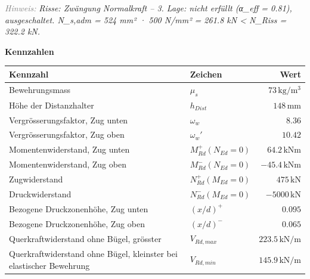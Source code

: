 \documentclass[11pt,a4paper]{article}
\newcommand{\hinweis}[2]{\par\noindent\textcolor{gray}{\textit{#1:}} \textit{#2}\par}
\begin{document}
\hinweis{Hinweis}{Risse: Zwängung Normalkraft – 3. Lage: nicht erfüllt (α\_eff = 0.81), ausgeschaltet. N\_s,adm = 524 mm² · 500 N/mm² = 261.8 kN < N\_Riss = 322.2 kN.}
\noindent\textbf{Kennzahlen}
\begin{longtable}{llr}
\hline
Kennzahl & Zeichen & Wert \\
\hline
\endhead
Bewehrungsmass & $\mu_s$ & $73\,\mathrm{kg}/\mathrm{m}^{3}$ \\
Höhe der Distanzhalter & $h_{Dist}$ & $148\,\mathrm{mm}$ \\
Vergrösserungsfaktor, Zug unten & $\omega_w$ & $8.36$ \\
Vergrösserungsfaktor, Zug oben & $\omega_w'$ & $10.42$ \\
Momentenwiderstand, Zug unten & $M_{Rd}^{+}(N_{Ed} = 0)$ & $64.2\,\mathrm{kNm}$ \\
Momentenwiderstand, Zug oben & $M_{Rd}^{-}(N_{Ed} = 0)$ & $-45.4\,\mathrm{kNm}$ \\
Zugwiderstand & $N_{Rd}^{+}(M_{Ed} = 0)$ & $475\,\mathrm{kN}$ \\
Druckwiderstand & $N_{Rd}^{-}(M_{Ed} = 0)$ & $-5000\,\mathrm{kN}$ \\
Bezogene Druckzonenhöhe, Zug unten & $\left(x/d\right)^{+}$ & $0.095$ \\
Bezogene Druckzonenhöhe, Zug oben & $\left(x/d\right)^{-}$ & $0.065$ \\
Querkraftwiderstand ohne Bügel, grösster & $V_{Rd,max}$ & $223.5\,\mathrm{kN}/\mathrm{m}$ \\
Querkraftwiderstand ohne Bügel, kleinster bei elastischer Bewehrung & $V_{Rd,min}$ & $145.9\,\mathrm{kN}/\mathrm{m}$ \\
\hline
\end{longtable}
\end{document}
